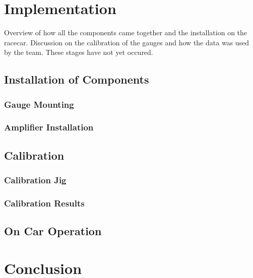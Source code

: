 \section{Implementation}
Overview of how all the components came together and the installation on the racecar. Discussion on the calibration of the gauges and how the data was used by the team. These stages have not yet occured.

\subsection{Installation of Components}

\subsubsection{Gauge Mounting}

\subsubsection{Amplifier Installation}


\subsection{Calibration}

\subsubsection{Calibration Jig}

\subsubsection{Calibration Results}


\subsection{On Car Operation}

\section{Conclusion}







